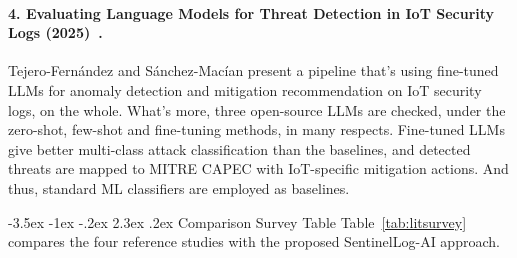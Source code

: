 \documentclass[12pt,a4paper]{report}
\makeatletter
\renewcommand\section{\@startsection {section}{1}{\z@}%
  {-3.5ex \@plus -1ex \@minus -.2ex}%
  {2.3ex \@plus .2ex}%
  {\normalfont\fontsize{17}{21}\selectfont\bfseries}}
\makeatother
\begin{document}
\paragraph{4. Evaluating Language Models for Threat Detection in IoT Security Logs (2025)~\cite{tejero2025}.}
Tejero-Fern\'andez and S\'anchez-Mac\'ian present a pipeline that's using fine-tuned LLMs for anomaly detection and mitigation recommendation on IoT security logs, on the whole. What's more, three open-source LLMs are checked, under the zero-shot, few-shot and fine-tuning methods, in many respects. Fine-tuned LLMs give better multi-class attack classification than the baselines, and detected threats are mapped to MITRE CAPEC with IoT-specific mitigation actions. And thus, standard ML classifiers are employed as baselines.

\section{Comparison Survey Table}
Table~\ref{tab:litsurvey} compares the four reference studies with the proposed SentinelLog-AI approach.
\end{document}
